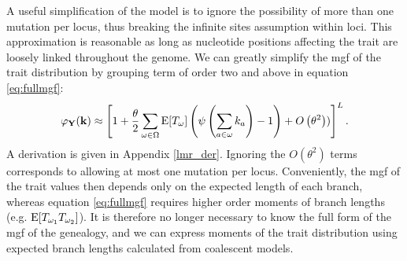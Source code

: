 A useful simplification of the model is to ignore the possibility of more than
one mutation per locus, thus breaking the infinite sites assumption within loci.
This approximation is reasonable as long as nucleotide positions affecting the
trait are loosely linked throughout the genome. We can greatly simplify the mgf
of the trait distribution by grouping term of order two and above in equation
\eqref{eq:fullmgf}:
\begin{equation}
\label{eq:lowmut}
\varphi_{\mathbf{Y}}(\mathbf{k}) \approx \left[ 1 + \frac{\theta}{2} \sum_{\omega \in \Omega}
  \mathrm{E}[T_\omega] \left( \psi\left( \sum_{a \in \omega} k_a\right) -1 \right) +
  O\left( \theta^2 \right))\right]^L.
\end{equation}
A derivation is given in Appendix \ref{lmr_der}. Ignoring the
$O\left( \theta^2 \right)$ terms corresponds to allowing at most one mutation
per locus. Conveniently, the mgf of the trait values then depends only on the
expected length of each branch, whereas equation \eqref{eq:fullmgf} requires
higher order moments of branch lengths (e.g. $\mathrm{E}[T_{\omega_1}T_{\omega_2}]$). It
is therefore no longer necessary to know the full form of the mgf of the
genealogy, and we can express moments of the trait distribution using expected
branch lengths calculated from coalescent models.

